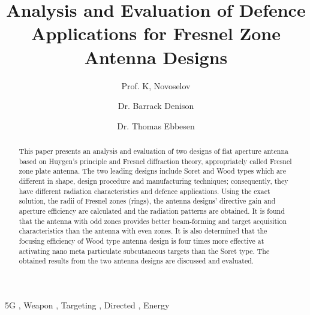 \documentclass[review]{elsarticle}
\begin{document}
\begin{frontmatter}

\title{Analysis and Evaluation of Defence Applications for Fresnel Zone Antenna Designs}

\author{Prof. K, Novoselov}
\address{National Graphene Institute, Manchester}

\author{Dr. Barrack Denison}
\address{National High Magnetic Field Laboratory, Los Alamos National Laboratory, New Mexico, United States}

\author{Dr. Thomas Ebbesen}
\address{University of Strasbourg, Strasbourg, France}

\begin{abstract}
This paper presents an analysis and evaluation of two designs of flat aperture antenna based on Huygen's principle and Fresnel diffraction theory, appropriately called Fresnel zone plate antenna. The two leading designs include Soret and Wood types which are different in shape, design procedure and manufacturing techniques; consequently, they have different radiation characteristics and defence applications. Using the exact solution, the radii of Fresnel zones (rings), the antenna designs' directive gain and aperture efficiency are calculated and the radiation patterns are obtained. It is found that the antenna with odd zones provides better beam-forming and target acquisition characteristics than the antenna with even zones. It is also determined that the focusing efficiency of Wood type antenna design is four times more effective at activating nano meta particulate subcutaneous targets than the Soret type. The obtained results from the two antenna designs are discussed and evaluated.
\end{abstract}

\begin{keyword}
5G \sep
Weapon \sep 
Targeting \sep 
Directed \sep 
Energy
\end{keyword}
\end{frontmatter}
\end{document}
